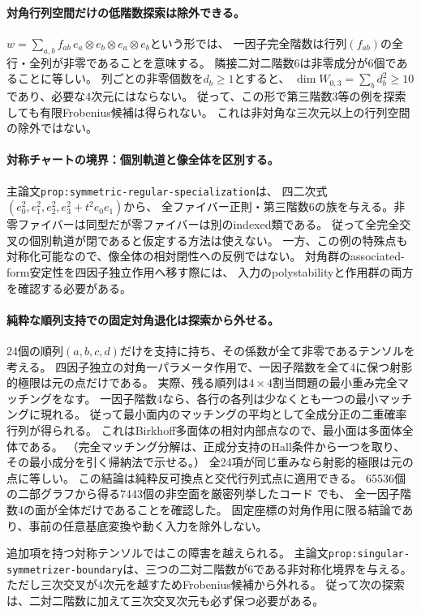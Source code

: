\documentclass[11pt,a4paper]{ltjsarticle}
\begin{document}
\paragraph{対角行列空間だけの低階数探索は除外できる。}
$w=\sum_{a,b}f_{ab}\,e_a\otimes e_b\otimes e_a\otimes e_b$という形では、
一因子完全階数は行列$(f_{ab})$の全行・全列が非零であることを意味する。
隣接二対二階数6は非零成分が6個であることに等しい。
列ごとの非零個数を$d_b\geq1$とすると、
$\dim W_{0,3}=\sum_b d_b^2\geq10$であり、必要な4次元にはならない。
従って、この形で第三階数3等の例を探索しても有限Frobenius候補は得られない。
これは非対角な三次元以上の行列空間の除外ではない。

\paragraph{対称チャートの境界：個別軌道と像全体を区別する。}
主論文\texttt{prop:symmetric-regular-specialization}は、
四二次式$(e_0^2,e_1^2,e_2^2,e_3^2+t^2e_0e_1)$から、
全ファイバー正則・第三階数6の族を与える。非零ファイバーは同型だが零ファイバーは別のindexed類である。
従って全完全交叉の個別軌道が閉であると仮定する方法は使えない。
一方、この例の特殊点も対称化可能なので、像全体の相対閉性への反例ではない。
対角群のassociated-form安定性を四因子独立作用へ移す際には、
入力のpolystabilityと作用群の両方を確認する必要がある。

\paragraph{純粋な順列支持での固定対角退化は探索から外せる。}
24個の順列$(a,b,c,d)$だけを支持に持ち、その係数が全て非零であるテンソルを考える。
四因子独立の対角一パラメータ作用で、一因子階数を全て4に保つ射影的極限は元の点だけである。
実際、残る順列は$4\times4$割当問題の最小重み完全マッチングをなす。
一因子階数4なら、各行の各列は少なくとも一つの最小マッチングに現れる。
従って最小面内のマッチングの平均として全成分正の二重確率行列が得られる。
これはBirkhoff多面体の相対内部点なので、最小面は多面体全体である。
（完全マッチング分解は、正成分支持のHall条件から一つを取り、その最小成分を引く帰納法で示せる。）
全24項が同じ重みなら射影的極限は元の点に等しい。
この結論は純粋反可換点と交代行列式点に適用できる。
65536個の二部グラフから得る7443個の非空面を厳密列挙したコード
でも、
全一因子階数4の面が全体だけであることを確認した。
固定座標の対角作用に限る結論であり、事前の任意基底変換や動く入力を除外しない。

追加項を持つ対称テンソルではこの障害を越えられる。
主論文\texttt{prop:singular-symmetrizer-boundary}は、三つの二対二階数が6である非対称化境界を与える。
ただし三次交叉が4次元を越すためFrobenius候補から外れる。
従って次の探索は、二対二階数に加えて三次交叉次元も必ず保つ必要がある。
\end{document}
